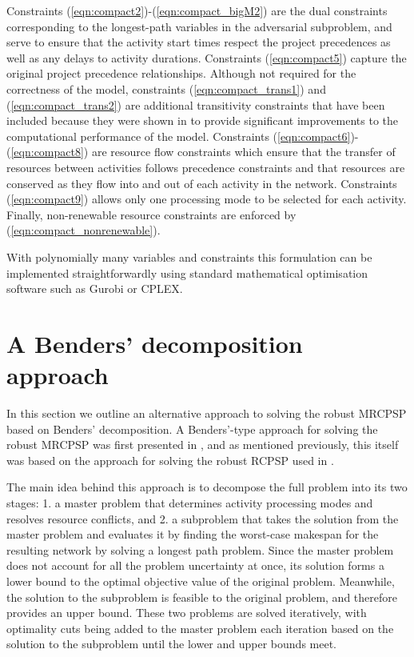 \documentclass[a4paper,abstracton]{scrartcl}
\begin{document}
Constraints (\ref{eqn:compact2})-(\ref{eqn:compact_bigM2}) are the dual constraints corresponding to the longest-path variables in the adversarial subproblem, and serve to ensure that the activity start times respect the project precedences as well as any delays to activity durations. Constraints (\ref{eqn:compact5}) capture the original project precedence relationships. Although not required for the correctness of the model, constraints (\ref{eqn:compact_trans1}) and (\ref{eqn:compact_trans2}) are additional transitivity constraints that have been included because they were shown in \cite{bold2021compact} to provide significant improvements to the computational performance of the model. Constraints (\ref{eqn:compact6})-(\ref{eqn:compact8}) are resource flow constraints which ensure that the transfer of resources between activities follows precedence constraints and that resources are conserved as they flow into and out of each activity in the network. Constraints (\ref{eqn:compact9}) allows only one processing mode to be selected for each activity. Finally, non-renewable resource constraints are enforced by (\ref{eqn:compact_nonrenewable}).

With polynomially many variables and constraints this formulation can be implemented straightforwardly using standard mathematical optimisation software such as Gurobi or CPLEX.

\section{A Benders' decomposition approach}\label{section:benders}

In this section we outline an alternative approach to solving the robust MRCPSP based on Benders' decomposition. A Benders'-type approach for solving the robust MRCPSP was first presented in \cite{balouka2021robust}, and as mentioned previously, this itself was based on the approach for solving the robust RCPSP used in \cite{bruni2017adjustable}.

The main idea behind this approach is to decompose the full problem into its two stages: 1. a master problem that determines activity processing modes and resolves resource conflicts, and 2. a subproblem that takes the solution from the master problem and evaluates it by finding the worst-case makespan for the resulting network by solving a longest path problem. Since the master problem does not account for all the problem uncertainty at once, its solution forms a lower bound to the optimal objective value of the original problem. Meanwhile, the solution to the subproblem is feasible to the original problem, and therefore provides an upper bound. These two problems are solved iteratively, with optimality cuts being added to the master problem each iteration based on the solution to the subproblem until the lower and upper bounds meet.
\end{document}
